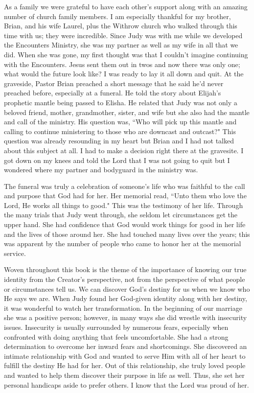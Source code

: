 \documentclass[oneside,12pt]{book}
\begin{document}
As a family we were grateful to have each other's support along with an amazing number of church family members. I am especially thankful for my brother, Brian, and his wife Laurel, plus the Withrow church who walked through this time with us; they were incredible. Since Judy was with me while we developed the Encounters Ministry, she was my partner as well as my wife in all that we did. When she was gone, my first thought was that I couldn't imagine continuing with the Encounters. Jesus sent them out in twos and now there was only one; what would the future look like? I was ready to lay it all down and quit. At the graveside, Pastor Brian preached a short message that he said he'd never preached before, especially at a funeral. He told the story about Elijah's prophetic mantle being passed to Elisha. He related that Judy was not only a beloved friend, mother, grandmother, sister, and wife but she also had the mantle and call of the ministry. His question was, ``Who will pick up this mantle and calling to continue ministering to those who are downcast and outcast?" This question was already resounding in my heart but Brian and I had not talked about this subject at all. I had to make a decision right there at the gravesite. I got down on my knees and told the Lord that I was not going to quit but I wondered where my partner and bodyguard in the ministry was.

The funeral was truly a celebration of someone's life who was faithful to the call and purpose that God had for her. Her memorial read, ``Unto them who love the Lord, He works all things to good." This was the testimony of her life. Through the many trials that Judy went through, she seldom let circumstances get the upper hand. She had confidence that God would work things for good in her life and the lives of those around her. She had touched many lives over the years; this was apparent by the number of people who came to honor her at the memorial service. 

Woven throughout this book is the theme of the importance of knowing our true identity from the Creator's perspective, not from the perspective of what people or circumstances tell us. We can discover God's destiny for us when we know who He says we are. When Judy found her God-given identity along with her destiny, it was wonderful to watch her transformation. In the beginning of our marriage she was a positive person; however, in many ways she did wrestle with insecurity issues. Insecurity is usually surrounded by numerous fears, especially when confronted with doing anything that feels uncomfortable. She had a strong determination to overcome her inward fears and shortcomings. She discovered an intimate relationship with God and wanted to serve Him with all of her heart to fulfill the destiny He had for her. Out of this relationship, she truly loved people and wanted to help them discover their purpose in life as well. Thus, she set her personal handicaps aside to prefer others. I know that the Lord was proud of her.
\end{document}
